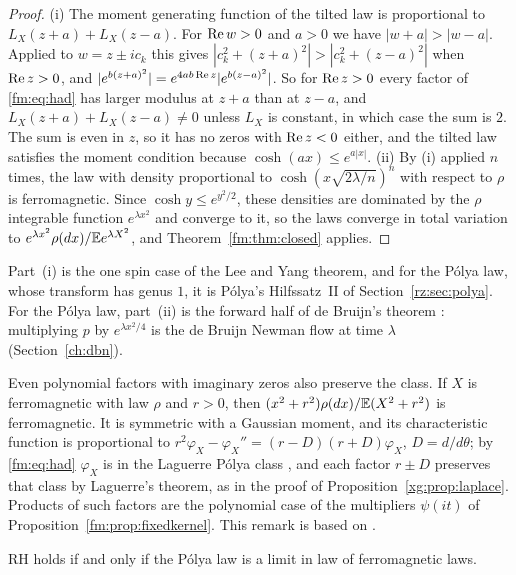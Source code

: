 \begin{proof}
(i) The moment generating function of the tilted law is proportional to $L_X(z+a)+L_X(z-a)$. For $\operatorname{Re} w>0$ and $a>0$ we have $|w+a|>|w-a|$. Applied to $w=z\pm ic_k$ this gives $|c_k^2+(z+a)^2|>|c_k^2+(z-a)^2|$ when $\operatorname{Re} z>0$, and $|e^{b(z+a)^2}|=e^{4ab\operatorname{Re} z}|e^{b(z-a)^2}|$. So for $\operatorname{Re} z>0$ every factor of \eqref{fm:eq:had} has larger modulus at $z+a$ than at $z-a$, and $L_X(z+a)+L_X(z-a)\ne0$ unless $L_X$ is constant, in which case the sum is $2$. The sum is even in $z$, so it has no zeros with $\operatorname{Re} z<0$ either, and the tilted law satisfies the moment condition because $\cosh(ax)\le e^{a|x|}$. (ii) By (i) applied $n$ times, the law with density proportional to $\cosh(x\sqrt{2\lambda/n})^n$ with respect to $\rho$ is ferromagnetic. Since $\cosh y\le e^{y^2/2}$, these densities are dominated by the $\rho$ integrable function $e^{\lambda x^2}$ and converge to it, so the laws converge in total variation to $e^{\lambda x^2}\rho(dx)/\mathbb{E} e^{\lambda X^2}$, and Theorem~\ref{fm:thm:closed} applies.
\end{proof}

Part~(i) is the one spin case of the Lee and Yang theorem, and for the P\'olya law, whose transform has genus $1$, it is P\'olya's Hilfssatz~II of Section~\ref{rz:sec:polya}. For the P\'olya law, part~(ii) is the forward half of de Bruijn's theorem \cite{deBruijn}: multiplying $p$ by $e^{\lambda x^2/4}$ is the de Bruijn Newman flow at time $\lambda$ (Section~\ref{ch:dbn}).

\begin{remark}\label{fm:rem:polyfactor}
Even polynomial factors with imaginary zeros also preserve the class. If $X$ is ferromagnetic with law $\rho$ and $r>0$, then $(x^2+r^2)\rho(dx)/\mathbb{E}(X^2+r^2)$ is ferromagnetic. It is symmetric with a Gaussian moment, and its characteristic function is proportional to $r^2\varphi_X-\varphi_X''=(r-D)(r+D)\varphi_X$, $D=d/d\theta$; by \eqref{fm:eq:had} $\varphi_X$ is in the Laguerre P\'olya class \cite{Levin64}, and each factor $r\pm D$ preserves that class by Laguerre's theorem, as in the proof of Proposition~\ref{xg:prop:laplace}. Products of such factors are the polynomial case of the multipliers $\psi(it)$ of Proposition~\ref{fm:prop:fixedkernel}. This remark is based on \cite{P26gumbelop}.
\end{remark}

\begin{corollary}\label{fm:cor:limit}
RH holds if and only if the P\'olya law is a limit in law of ferromagnetic laws.
\end{corollary}

